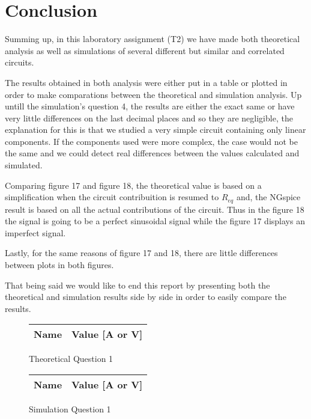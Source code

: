 \section{Conclusion}
\label{sec:conclusion}

Summing up, in this laboratory assignment (T2) we have made both theoretical analysis as well as simulations of several different but similar and correlated circuits. \par
The results obtained in both analysis were either put in a table or plotted in order to make comparations between the theoretical and simulation analysis.
Up untill the simulation's question 4, the results are either the exact same or have very little differences on the last decimal places and so they are negligible, the explanation for this is that we studied a very simple circuit containing only linear components. If the components used were more complex, the case would not be the same and we could detect real differences between the values calculated and simulated. \par
Comparing figure 17 and figure 18, the theoretical value is based on a simplification when the circuit contribuition is resumed to $R_{eq}$ and, the NGspice result is based on all the actual contributions of the circuit. Thus in the figure 18 the signal is going to be a perfect sinusoidal signal while the figure 17 displays an imperfect signal. \par
Lastly, for the same reasons of figure 17 and 18, there are little differences between plots in both figures. \par
That being said we would like to end this report by presenting both the theoretical and simulation results side by side in order to easily compare the results. \par

\begin{figure}[H]
      \centering
      \begin{tabular}{ | c | c | }
      \hline    
      {\bf Name} & {\bf Value [A or V]} \\ \hline
      \hline
      \end{tabular}
      \caption{Theoretical Question 1}
    \endminipage\hfill
      \centering
      \begin{tabular}{ | c | c | }
      \hline    
      {\bf Name} & {\bf Value [A or V]} \\ \hline
      \end{tabular}
      \caption{Simulation Question 1}
    \endminipage\hfill
\end{figure}
